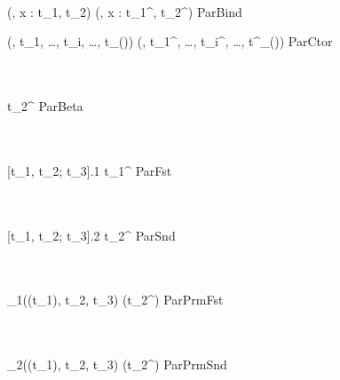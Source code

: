 
\Rule{\ParBinderReduction}
    {
         \\
    }
    {(\kappa, x : t_1, t_2) \parred {}(\kappa, x : t_1^\prime, t_2^\prime) }
    {ParBind}

\Rule{\ParConstructorReduction}
    {
    }
    {(\kappa, t_1, \ldots, t_i, \ldots, t_{(\kappa)}) \parred {}(\kappa, t_1^\prime, \ldots, t_i^\prime, \ldots, t^\prime_{(\kappa)}) }
    {ParCtor}

\Rule{\ParBetaReduction}
    {
         \\
         \\
    }
    {  \parred [x := t_3^\prime]t_2^\prime }
    {ParBeta}

\Rule{\ParFstReduction}
    {
         \\
         \\
    }
    { [t_1, t_2; t_3].1 \parred t_1^\prime }
    {ParFst}

\Rule{\ParSndReduction}
    {
         \\
         \\
    }
    { [t_1, t_2; t_3].2 \parred t_2^\prime }
    {ParSnd}

\Rule{\ParPrmFstReduction}
    {
         \\
         \\
    }
    { \vartheta_1((t_1), t_2, t_3) \parred {}(t_2^\prime) }
    {ParPrmFst}

\Rule{\ParPrmSndReduction}
    {
         \\
         \\
    }
    { \vartheta_2((t_1), t_2, t_3) \parred {}(t_2^\prime) }
    {ParPrmSnd}


